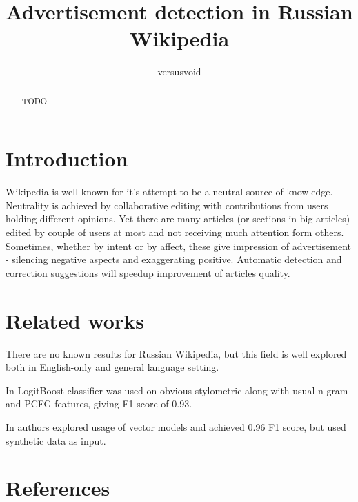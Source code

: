 \documentclass[]{article}
\title{Advertisement detection in Russian Wikipedia}
\author{versusvoid}
\begin{document}
\maketitle

\begin{abstract}

TODO

\end{abstract}

\section{Introduction}

Wikipedia is well known for it's attempt to be a neutral source of knowledge. 
Neutrality is achieved by collaborative editing with contributions from users 
holding different opinions. Yet there are many articles (or sections in big 
articles) edited by couple of users at most and not receiving much attention 
form others. Sometimes, whether by intent or by affect, these give impression 
of advertisement - silencing negative aspects and exaggerating positive. 
Automatic detection and correction suggestions will speedup improvement of
articles quality.

\section{Related works}

There are no known results for Russian Wikipedia, but this field is well 
explored both in English-only and general language setting.


In \citealp{bhosale:emnlp13} LogitBoost classifier was used on obvious 
stylometric along with usual n-gram and PCFG features, giving F1 score of 0.93.

In \citealp{deep-learning-vectors} authors explored usage of vector models and
achieved 0.96 F1 score, but used synthetic data as input.

\section*{References}




\end{document}
